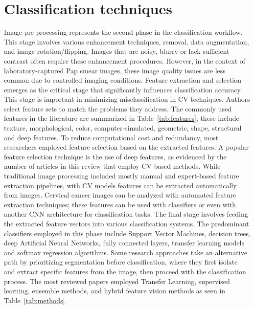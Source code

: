 \documentclass[final,5p,times,twocolumn,authoryear]{elsarticle}
\begin{document}
\section{Classification techniques}
Image pre-processing represents the second phase in the classification workflow. This stage involves various enhancement techniques, removal, data augmentation, and image rotation/flipping. Images that are noisy, blurry or lack sufficient contrast often require these enhancement procedures. However, in the context of laboratory‑captured Pap smear images, these image quality issues are less common due to controlled imaging conditions.
Feature extraction and selection emerges as the critical stage that significantly influences classification accuracy. This stage is important in minimizing misclassification in CV techniques. Authors select feature sets to match the problems they address. The commonly used features in the literature are summarized in Table~\ref{tab:features}; these include texture, morphological, color, computer‑simulated, geometric, shape, structural and deep features. To reduce computational cost and redundancy, most researchers employed feature selection based on the extracted features. A popular feature selection technique is the use of deep features, as evidenced by the number of articles in this review that employ CV‑based methods. While traditional image processing included mostly manual and expert‑based feature extraction pipelines, with CV models features can be extracted automatically from images. Cervical cancer images can be analyzed with automated feature extraction techniques; these features can be used with classifiers or even with another CNN architecture for classification tasks.
The final stage involves feeding the extracted feature vectors into various classification systems. The predominant classifiers employed in this phase include Support Vector Machines, decision trees, deep Artificial Neural Networks, fully connected layers, transfer learning models and softmax regression algorithms. Some research approaches take an alternative path by prioritizing segmentation before classification, where they first isolate and extract specific features from the image, then proceed with the classification process. The most reviewed papers employed Transfer Learning, supervised learning, ensemble methods, and hybrid feature vision methods as seen in Table~\ref{tab:methods}.
\end{document}
